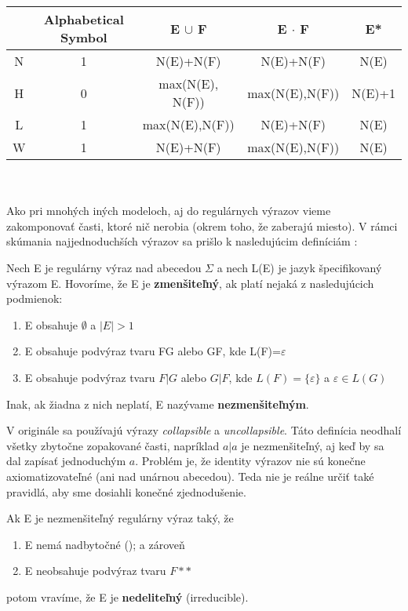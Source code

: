 \begin{tabular}{|c||c|c|c|c|}
\hline
 ~ & Alphabetical Symbol & E $\cup$ F & E $\cdot$ F & E*
\\ \hline\hline
N & 1 & N(E)+N(F) & N(E)+N(F) & N(E)
\\ \hline 
H & 0 & max(N(E), N(F)) & max(N(E),N(F)) & N(E)+1
\\ \hline
L & 1 & max(N(E),N(F)) & N(E)+N(F) & N(E)
\\ \hline
W & 1 & N(E)+N(F) & max(N(E),N(F)) & N(E)
\\ \hline
\end{tabular}
\\ \\

Ako pri mnohých iných modeloch, aj do regulárnych výrazov vieme zakomponovať časti, ktoré nič nerobia (okrem toho, že zaberajú miesto). V rámci skúmania najjednoduchších výrazov sa prišlo k nasledujúcim definíciám \cite{newResults}:

\begin{df}
Nech E je regulárny výraz nad abecedou $\Sigma$ a nech L(E) je jazyk špecifikovaný výrazom E. Hovoríme, že E je \textbf{zmenšiteľný}, ak platí nejaká z nasledujúcich podmienok:
\begin{enumerate}
\item E obsahuje $\emptyset$ a $|E|>1$
\item E obsahuje podvýraz tvaru FG alebo GF, kde L(F)={$\varepsilon$}
\item E obsahuje podvýraz tvaru $F|G$ alebo $G|F$, kde $L(F)=\lbrace \varepsilon \rbrace$ a $\varepsilon \in L(G)$
\end{enumerate}
Inak, ak žiadna z nich neplatí, E nazývame \textbf{nezmenšiteľným}.
\end{df}

V originále sa používajú výrazy \textit{collapsible} a \textit{uncollapsible}. Táto definícia neodhalí všetky zbytočne zopakované časti, napríklad $a|a$ je nezmenšiteľný, aj keď by sa dal zapísať jednoduchým $a$. Problém je, že identity výrazov nie sú konečne axiomatizovateľné (ani nad unárnou abecedou). Teda nie je reálne určiť také pravidlá, aby sme dosiahli konečné zjednodušenie. \cite{newResults}

\begin{df}
Ak E je nezmenšiteľný regulárny výraz taký, že
\begin{enumerate}
\item E nemá nadbytočné (); a zároveň
\item E neobsahuje podvýraz tvaru $F**$
\end{enumerate}
potom vravíme, že E je \textbf{nedeliteľný} (irreducible).
\end{df}

